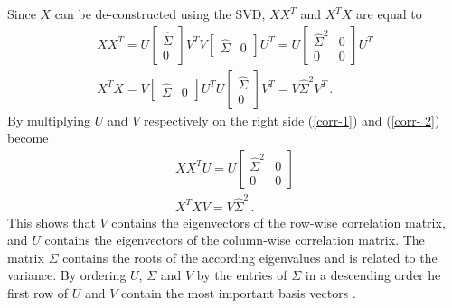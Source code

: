 Since \(X\) can be de-constructed using the SVD, \(XX^{T}\) and \(X^{T}X\) are equal to
\begin{gather}
XX^{T} = U\begin{bmatrix}
\hat{\Sigma} \\
0
\end{bmatrix}V^{T}V\begin{bmatrix}
\hat{\Sigma} & 0
\end{bmatrix}U^{T} = U \begin{bmatrix}
\hat{\Sigma}^{2} & 0 \\
0 & 0
\end{bmatrix} U^{T} \label{corr-1}\\
X^{T}X = V \begin{bmatrix}
\hat{\Sigma} & 0
\end{bmatrix} U^{T}U \begin{bmatrix}
\hat{\Sigma} \\
0
\end{bmatrix} V^{T} = V\hat{\Sigma}^{2}V^{T} \,. \label{corr- 2}
\end{gather}
By multiplying \(U\) and \(V\) respectively on the right side (\ref{corr-1}) and (\ref{corr- 2}) become
\begin{gather}
XX^{T}U = U \begin{bmatrix}
\hat{\Sigma}^{2} & 0 \\
0 & 0
\end{bmatrix} \\
X^{T}XV = V\hat{\Sigma}^{2} \,.
\end{gather}
This shows that \(V\) contains the eigenvectors of the row-wise correlation matrix, and \(U\) contains the eigenvectors of the column-wise correlation matrix.
The matrix \(\Sigma\) contains the roots of the according eigenvalues and is related to the variance.
By ordering \(U\), \(\Sigma\) and \(V\) by the entries of \(\Sigma\) in a descending order he first row of \(U\) and \(V\) contain the most important basis vectors \cite{brunton_kutz_2019b}.


